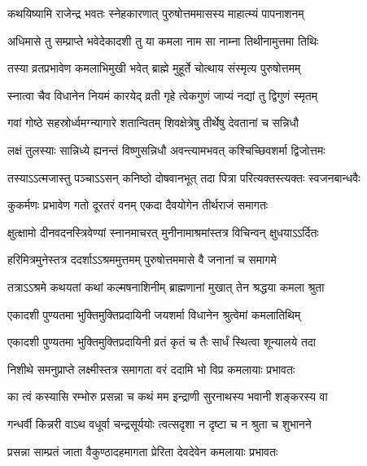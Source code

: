\twolineshloka
{कथयिष्यामि राजेन्द्र भवतः स्नेहकारणात्}
{पुरुषोत्तममासस्य माहात्म्यं पापनाशनम्}%

\twolineshloka
{अधिमासे तु सम्प्राप्ते भवेदेकादशी तु या}
{कमला नाम सा नाम्ना तिथीनामुत्तमा तिथिः}%

\twolineshloka
{तस्या व्रतप्रभावेण कमलाभिमुखी भवेत्}
{ब्राह्मे मुहूर्ते चोत्थाय संस्मृत्य पुरुषोत्तमम्}%

\twolineshloka
{स्नात्वा चैव विधानेन नियमं कारयेद् व्रती}
{गृहे त्वेकगुणं जाप्यं नद्यां तु द्विगुणं स्मृतम्}%

\twolineshloka
{गवां गोष्ठे सहस्रोर्ध्वमग्न्यागारे शतान्वितम्}
{शिवक्षेत्रेषु तीर्थेषु देवतानां च सन्निधौ}%

\twolineshloka
{लक्षं तुलस्याः सान्निध्ये ह्यनन्तं विष्णुसन्निधौ}
{अवन्त्यामभवत् कश्चिच्छिवशर्मा द्विजोत्तमः}%

\twolineshloka
{तस्याऽऽत्मजास्तु पञ्चाऽऽसन् कनिष्ठो दोषवानभूत्}
{तदा पित्रा परित्यक्तस्त्यक्तः स्वजनबान्धवैः}%

\twolineshloka
{कुकर्मणः प्रभावेण गतो दूरतरं वनम्}
{एकदा दैवयोगेन तीर्थराजं समागतः}%

\twolineshloka
{क्षुत्क्षामो दीनवदनस्त्रिवेण्यां स्नानमाचरत्}
{मुनीनामाश्रमांस्तत्र विचिन्वन् क्षुधयाऽऽर्दितः}%

\twolineshloka
{हरिमित्रमुनेस्तत्र ददर्शाऽऽश्रममुत्तमम्}
{पुरुषोत्तममासे वै जनानां च समागमे}%

\twolineshloka
{तत्राऽऽश्रमे कथयतां कथां कल्मषनाशिनीम्}
{ब्राह्मणानां मुखात् तेन श्रद्धया कमला श्रुता}%

\twolineshloka
{एकादशी पुण्यतमा भुक्तिमुक्तिप्रदायिनी}
{जयशर्मा विधानेन श्रुत्वेमां कमलातिथिम्}%

\twolineshloka
{एकादशी पुण्यतमा भुक्तिमुक्तिप्रदायिनी}
{व्रतं कृतं च तैः सार्धं स्थित्वा शून्यालये तदा}%

\twolineshloka
{निशीथे समनुप्राप्ते लक्ष्मीस्तत्र समागता}
{वरं ददामि भो विप्र कमलायाः प्रभावतः}%


\twolineshloka
{का त्वं कस्यासि रम्भोरु प्रसन्ना च कथं मम}
{इन्द्राणी सुरनाथस्य भवानी शङ्करस्य वा}%

\twolineshloka
{गन्धर्वी किन्नरी वाऽथ वधूर्वा चन्द्रसूर्ययोः}
{त्वत्सदृशा न दृष्टा च न श्रुता च शुभानने}%


\twolineshloka
{प्रसन्ना साम्प्रतं जाता वैकुण्ठादहमागता}
{प्रेरिता देवदेवेन कमलायाः प्रभावतः}%

